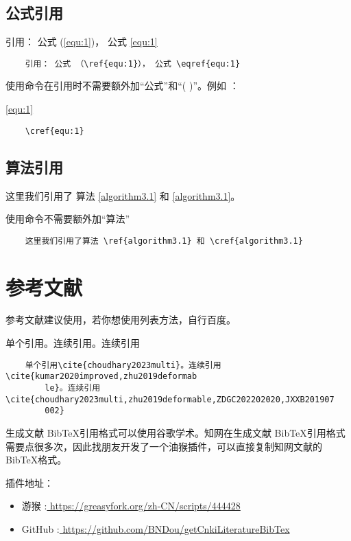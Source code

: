 \subsection{公式引用}
引用： 公式 (\ref{equ:1})， 公式 \eqref{equ:1}
\begin{lstlisting}
	引用： 公式 （\ref{equ:1}）， 公式 \eqref{equ:1}
\end{lstlisting}

使用\myverb{\cref{}}命令在引用时不需要额外加“公式”和“( )”。例如 ：

\cref{equ:1}

\begin{lstlisting}
	\cref{equ:1}
\end{lstlisting}

\subsection{算法引用}

这里我们引用了 算法 \ref{algorithm3.1} 和 \cref{algorithm3.1}。

使用\myverb{\cref{}}命令不需要额外加“算法”

\begin{lstlisting}
	这里我们引用了算法 \ref{algorithm3.1} 和 \cref{algorithm3.1}
\end{lstlisting}

\section{参考文献}
参考文献建议使用，若你想使用列表方法，自行百度。

单个引用\cite{choudhary2023multi}。连续引用\cite{kumar2020improved,zhu2019deformable}。连续引用\cite{choudhary2023multi,zhu2019deformable,ZDGC202202020,JXXB201907002}
\begin{lstlisting}
	单个引用\cite{choudhary2023multi}。连续引用\cite{kumar2020improved,zhu2019deformab
		le}。连续引用\cite{choudhary2023multi,zhu2019deformable,ZDGC202202020,JXXB201907
		002}
\end{lstlisting}
生成文献 Bib\TeX 引用格式可以使用谷歌学术。知网在生成文献 Bib\TeX 引用格式需要点很多次，因此找朋友开发了一个油猴插件，可以直接复制知网文献的Bib\TeX 格式。

插件地址：\begin{itemize}
	\item 游猴 :\href{https://greasyfork.org/zh-CN/scripts/444428}{ \;\;https://greasyfork.org/zh-CN/scripts/444428}
	
	\item GitHub \faGithub :\href{https://github.com/BNDou/getCnkiLiteratureBibTex}{ \;\;https://github.com/BNDou/getCnkiLiteratureBibTex}
\end{itemize}


